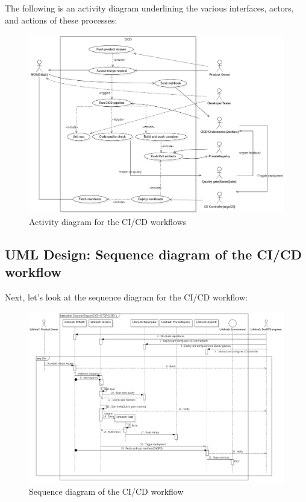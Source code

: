 The following is an activity diagram underlining the various interfaces, actors, and actions of these processes: 

\begin{figure}[H]\centering
\includegraphics[width=1.0\textwidth,angle=00]{assets/f45.png}
\caption{ Activity diagram for the CI/CD workflows}
\label{fig:Activity diagram for the CI/CD workflows}
\end{figure}

\subsection{UML Design: Sequence diagram of the CI/CD workflow }

Next, let’s look at the sequence diagram for the CI/CD workflow: 
\begin{figure}[H]\centering
\includegraphics[width=1.0\textwidth,angle=00]{assets/f46.png}
\caption{ Sequence diagram of the CI/CD workflow}
\label{fig:sequence diagram of the CI/CD workflow}
\end{figure}

